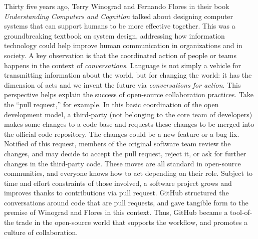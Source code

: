 \documentclass{statement}
\newlength{\up}
\begin{document}
Thirty five years ago, Terry Winograd and Fernando Flores in their book \emph{Understanding Computers and Cognition} \citep{winograd-flores1986} talked about designing computer systems that can support humans to be more effective together. 
This was a groundbreaking textbook on system design, addressing how information technology could help improve human communication in organizations and in society. 
A key observation is that the coordinated action of people or teams happens in the context of \emph{conversations}. 
Language is not simply a vehicle for transmitting information about the world, but for changing the world: it has the dimension of acts and we invent the future via \emph{conversations for action}. 
This perspective helps explain the success of open-source collaboration practices. Take the ``pull request,'' for example. 
In this basic coordination of the open development model, a third-party (not belonging to the core team of developers) makes some changes to a code base and requests these changes to be merged into the official code repository. 
The changes could be a new feature or a bug fix. 
Notified of this request, members of the original software team review the changes, and may decide to accept the pull request, reject it, or ask for further changes in the third-party code. 
These moves are all standard in open-source communities, and everyone knows how to act depending on their role. 
Subject to time and effort constraints of those involved, a software project grows and improves thanks to contributions via pull request. 
GitHub structured the conversations around code that are pull requests, and gave tangible form to the premise of Winograd and Flores in this context. 
Thus, GitHub became a tool-of-the trade in the open-source world that supports the workflow, and promotes a culture of collaboration. 
\end{document}
